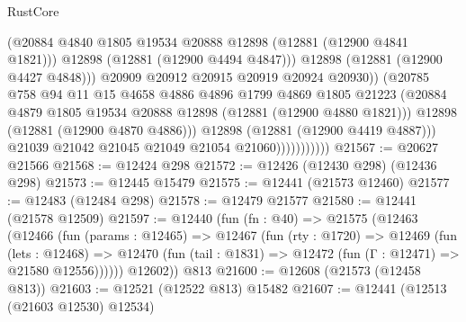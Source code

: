 \begin{lexlean}{RustCore}
\begin{coremodule}
                                    (@20884
                                      @4840
                                      @1805
                                      @19534
                                      @20888
                                      @12898
                                      (@12881 (@12900 @4841 @1821)))
                                    @12898
                                    (@12881 (@12900 @4494 @4847)))
                                  @12898
                                  (@12881 (@12900 @4427 @4848)))
                                @20909
                                @20912
                                @20915
                                @20919
                                @20924
                                @20930))
                            (@20785
                              @758
                              @94
                              @11
                              @15
                              @4658
                              @4886
                              @4896
                              @1799
                              @4869
                              @1805
                              @21223
                              (@20884
                                @4879
                                @1805
                                @19534
                                @20888
                                @12898
                                (@12881 (@12900 @4880 @1821)))
                              @12898
                              (@12881 (@12900 @4870 @4886)))
                            @12898
                            (@12881 (@12900 @4419 @4887)))
                          @21039
                          @21042
                          @21045
                          @21049
                          @21054
                          @21060)))))))))))
@21567 := @20627 @21566
@21568 := @12424 @298
@21572 := @12426 (@12430 @298) (@12436 @298)
@21573 := @12445 @15479
@21575 := @12441 (@21573 @12460)
@21577 := @12483 (@12484 @298)
@21578 := @12479 @21577
@21580 := @12441 (@21578 @12509)
@21597 := @12440
    (fun (fn : @40) =>
    @21575
      (@12463
        (@12466
          (fun (params : @12465) =>
          @12467
            (fun (rty : @1720) =>
            @12469
              (fun (lets : @12468) =>
              @12470 (fun (tail : @1831) => @12472 (fun (Γ : @12471) => @21580 @12556))))))
        @12602))
    @813
@21600 := @12608 (@21573 (@12458 @813))
@21603 := @12521 (@12522 @813) @15482
@21607 := @12441 (@12513 (@21603 @12530) @12534)

\end{coremodule}
\end{lexlean}
